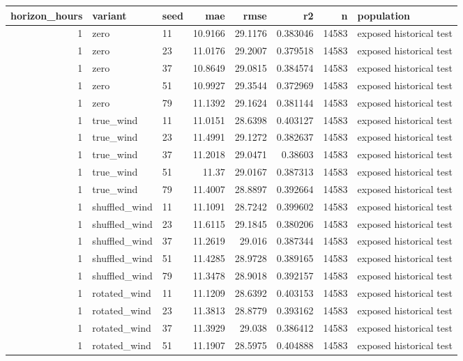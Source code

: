 \begin{tabular}{rllrrrrl}
\hline
horizon\_hours & variant & seed & mae & rmse & r2 & n & population \\
\hline
1 & zero & 11 & 10.9166 & 29.1176 & 0.383046 & 14583 & exposed historical test \\
1 & zero & 23 & 11.0176 & 29.2007 & 0.379518 & 14583 & exposed historical test \\
1 & zero & 37 & 10.8649 & 29.0815 & 0.384574 & 14583 & exposed historical test \\
1 & zero & 51 & 10.9927 & 29.3544 & 0.372969 & 14583 & exposed historical test \\
1 & zero & 79 & 11.1392 & 29.1624 & 0.381144 & 14583 & exposed historical test \\
1 & true\_wind & 11 & 11.0151 & 28.6398 & 0.403127 & 14583 & exposed historical test \\
1 & true\_wind & 23 & 11.4991 & 29.1272 & 0.382637 & 14583 & exposed historical test \\
1 & true\_wind & 37 & 11.2018 & 29.0471 & 0.38603 & 14583 & exposed historical test \\
1 & true\_wind & 51 & 11.37 & 29.0167 & 0.387313 & 14583 & exposed historical test \\
1 & true\_wind & 79 & 11.4007 & 28.8897 & 0.392664 & 14583 & exposed historical test \\
1 & shuffled\_wind & 11 & 11.1091 & 28.7242 & 0.399602 & 14583 & exposed historical test \\
1 & shuffled\_wind & 23 & 11.6115 & 29.1845 & 0.380206 & 14583 & exposed historical test \\
1 & shuffled\_wind & 37 & 11.2619 & 29.016 & 0.387344 & 14583 & exposed historical test \\
1 & shuffled\_wind & 51 & 11.4285 & 28.9728 & 0.389165 & 14583 & exposed historical test \\
1 & shuffled\_wind & 79 & 11.3478 & 28.9018 & 0.392157 & 14583 & exposed historical test \\
1 & rotated\_wind & 11 & 11.1209 & 28.6392 & 0.403153 & 14583 & exposed historical test \\
1 & rotated\_wind & 23 & 11.3813 & 28.8779 & 0.393162 & 14583 & exposed historical test \\
1 & rotated\_wind & 37 & 11.3929 & 29.038 & 0.386412 & 14583 & exposed historical test \\
1 & rotated\_wind & 51 & 11.1907 & 28.5975 & 0.404888 & 14583 & exposed historical test \\

\end{tabular}
